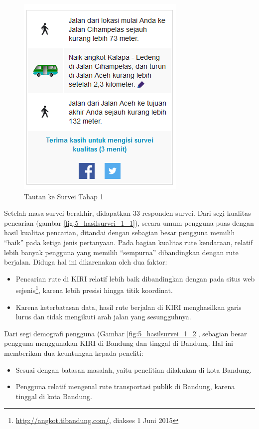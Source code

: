 \begin{figure}
	\centering
	\includegraphics[scale=0.75]{Gambar/5_survei_1}
	\caption{Tautan ke Survei Tahap 1} 
	\label{fig:5_survei_1}
\end{figure}

Setelah masa survei berakhir, didapatkan 33 responden survei. Dari segi kualitas pencarian (gambar \ref{fig:5_hasilsurvei_1_1}), secara umum pengguna puas dengan hasil kualitas pencarian, ditandai dengan sebagian besar pengguna memilih ``baik'' pada ketiga jenis pertanyaan. Pada bagian kualitas rute kendaraan, relatif lebih banyak pengguna yang memilih ``sempurna'' dibandingkan dengan rute berjalan. Diduga hal ini dikarenakan oleh dua faktor:

\begin{itemize}
	\item Pencarian rute di KIRI relatif lebih baik dibandingkan dengan pada situs web sejenis\footnote{\url{http://angkot.tibandung.com/}, diakses 1 Juni 2015}, karena lebih presisi hingga titik koordinat.
	\item Karena keterbatasan data, hasil rute berjalan di KIRI menghasilkan garis lurus dan tidak mengikuti arah jalan yang sesungguhnya.
\end{itemize}

Dari segi demografi pengguna (Gambar \ref{fig:5_hasilsurvei_1_2}, sebagian besar pengguna menggunakan KIRI di Bandung dan tinggal di Bandung. Hal ini memberikan dua keuntungan kepada peneliti:

\begin{itemize}
	\item Sesuai dengan batasan masalah, yaitu penelitian dilakukan di kota Bandung.
	\item Pengguna relatif mengenal rute transportasi publik di Bandung, karena tinggal di kota Bandung.
\end{itemize}

